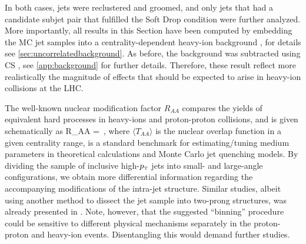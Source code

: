 In both cases, jets were reclustered and groomed, and only jets that had a candidate subjet pair that fulfilled the Soft Drop condition were further analyzed.
More importantly, all results in this Section have been computed by embedding the MC jet samples into a centrality-dependent heavy-ion background \cite{deBarros:2012ws}, for details see \autoref{sec:uncorrelatedbackground}. As before, the background was subtracted using CS \cite{Berta:2014eza}, see \autoref{app:background} for further details. Therefore, these result reflect more realistically the magnitude of effects that should be expected to arise in heavy-ion collisions at the LHC.

The well-known nuclear modification factor $R_{AA}$ compares the yields of equivalent hard processes in heavy-ions and proton-proton collisions, and is given schematically as
\beq
\label{eq:RAA}
R_{AA} =  \,,
\eeq
where
$\langle T_{AA} \rangle$ is the nuclear overlap function in a given centrality range,
is a standard benchmark for estimating/tuning medium parameters in theoretical calculations and Monte Carlo jet quenching models. By dividing the sample of inclusive high-$p_{\text{\tiny T}}$ jets into small- and large-angle configurations, we obtain more differential information regarding the accompanying modifications of the intra-jet structure. Similar studies, albeit using another method to dissect the jet sample into two-prong structures, was already presented in \cite{Zhang:2015trf,Apolinario:2017qay}.
Note, however, that the suggested ``binning'' procedure could be sensitive to different physical mechanisms separately in the proton-proton and heavy-ion events. Disentangling this would demand further studies.

